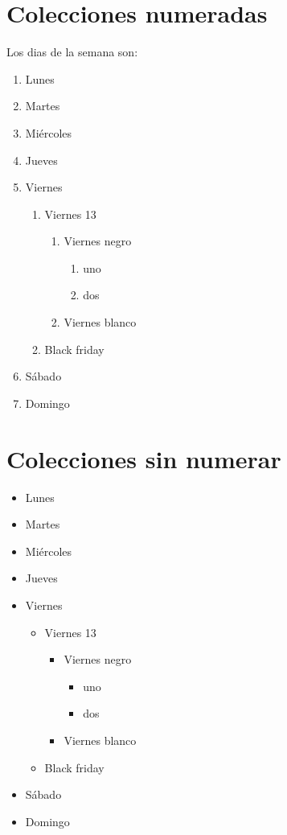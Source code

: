 \documentclass[10pt,a4paper]{article}
\begin{document}
\section{Colecciones numeradas}
Los dias de la semana son:
  \begin{enumerate}
    \item Lunes
    \item Martes
    \item Miércoles
    \item Jueves
    \item Viernes
          \begin{enumerate}
             \item Viernes 13
                   \begin{enumerate}
                     \item Viernes negro
                           \begin{enumerate}
                              \item uno
                              \item dos
                           \end{enumerate}
                     \item Viernes blanco
                   \end{enumerate}
             \item Black friday
          \end{enumerate}
    \item Sábado
    \item Domingo
  \end{enumerate}   
\section{Colecciones sin numerar}
  \begin{itemize}
    \item Lunes
    \item Martes
    \item Miércoles
    \item Jueves
    \item Viernes
          \begin{itemize}
             \item Viernes 13
                   \begin{itemize}
                     \item Viernes negro
                           \begin{itemize}
                              \item uno
                              \item dos
                           \end{itemize}
                     \item Viernes blanco
                   \end{itemize}
             \item Black friday
          \end{itemize}
    \item Sábado
    \item Domingo
  \end{itemize}   
  
\end{document}
